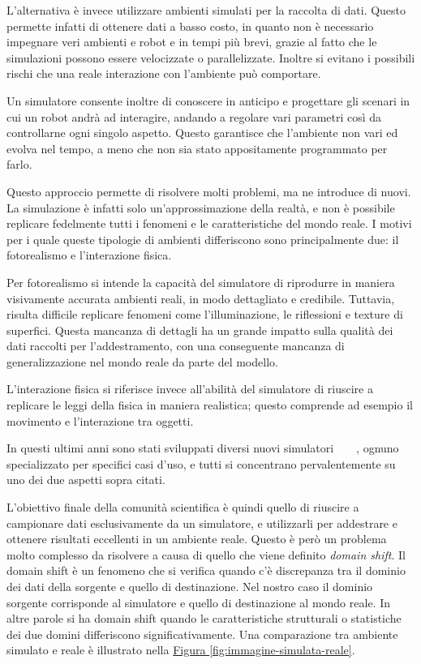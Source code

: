\documentclass[12pt]{report}
\begin{document}
L'alternativa è invece utilizzare ambienti simulati per la raccolta di dati. Questo permette infatti di ottenere dati a basso costo, in quanto non è necessario impegnare veri ambienti e robot e in tempi più brevi, grazie al fatto che le simulazioni possono essere velocizzate o parallelizzate. Inoltre si evitano i possibili rischi che una reale interazione con l'ambiente può comportare.

Un simulatore consente inoltre di conoscere in anticipo e progettare gli scenari in cui un robot andrà ad interagire, andando a regolare vari parametri così da controllarne ogni singolo aspetto. Questo garantisce che l'ambiente non vari ed evolva nel tempo, a meno che non sia stato appositamente programmato per farlo.

Questo approccio permette di risolvere molti problemi, ma ne introduce di nuovi. La simulazione è infatti solo un'approssimazione della realtà, e non è possibile replicare fedelmente tutti i fenomeni e le caratteristiche del mondo reale. I motivi per i quale queste tipologie di ambienti differiscono sono principalmente due: il fotorealismo e l'interazione fisica.

Per fotorealismo si intende la capacità del simulatore di riprodurre in maniera visivamente accurata ambienti reali, in modo dettagliato e credibile. Tuttavia, risulta difficile replicare fenomeni come l'illuminazione, le riflessioni e texture di superfici. Questa mancanza di dettagli ha un grande impatto sulla qualità dei dati raccolti per l'addestramento, con una conseguente mancanza di generalizzazione nel mondo reale da parte del modello.

L'interazione fisica si riferisce invece all'abilità del simulatore di riuscire a replicare le leggi della fisica in maniera realistica; questo comprende ad esempio il movimento e l'interazione tra oggetti. 

In questi ultimi anni sono stati sviluppati diversi nuovi simulatori~\cite{kolve2022ai2thorinteractive3denvironment}~\cite{NEURIPS2021_021bbc7e}~\cite{urakami2022doorgymscalabledooropening}~\cite{1389727}, ognuno specializzato per specifici casi d'uso, e tutti si concentrano pervalentemente su uno dei due aspetti sopra citati.

L'obiettivo finale della comunità scientifica è quindi quello di riuscire a campionare dati esclusivamente da un simulatore, e utilizzarli per addestrare e ottenere risultati eccellenti in un ambiente reale. Questo è però un problema molto complesso da risolvere a causa di quello che viene definito \textit{domain shift}. Il domain shift è un fenomeno che si verifica quando c'è discrepanza tra il dominio dei dati della sorgente e quello di destinazione. Nel nostro caso il dominio sorgente corrisponde al simulatore e quello di destinazione al mondo reale. In altre parole si ha domain shift quando le caratteristiche strutturali o statistiche dei due domini differiscono significativamente. Una comparazione tra ambiente simulato e reale è illustrato nella \hyperref[fig:immagine-simulata-reale]{Figura \ref{fig:immagine-simulata-reale}}.
\end{document}
